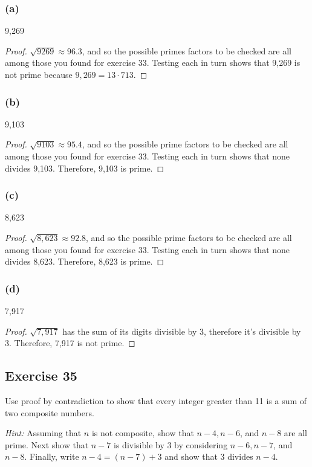 \documentclass[14pt]{extarticle}
\begin{document}
\subsubsection{(a)}
9,269

\begin{proof}
$\sqrt{9269} \approx 96.3$, and so the possible primes factors to be checked are all among those you found for exercise 33. Testing each in turn shows that 9,269 is not prime because $9,269 = 13 \cdot 713$.

\end{proof}

\subsubsection{(b)}
9,103

\begin{proof}
$\sqrt{9103} \approx 95.4$, and so the possible prime factors to be checked are all among those you found for exercise 33. Testing each in turn shows that none divides 9,103. Therefore, 9,103 is prime.
\end{proof}

\subsubsection{(c)}
8,623

\begin{proof}
$\sqrt{8,623} \approx 92.8$, and so the possible prime factors to be checked are all among those you found for exercise 33. Testing each in turn shows that none divides
8,623. Therefore, 8,623 is prime.
\end{proof}

\subsubsection{(d)}
7,917

\begin{proof}
$\sqrt{7,917}$ has the sum of its digits divisible by 3, therefore it's divisible by 3. Therefore, 7,917 is not prime.
\end{proof}

\subsection{Exercise 35}
Use proof by contradiction to show that every integer greater than 11 is a sum of two composite numbers.

{\it Hint:} Assuming that $n$ is not composite, show that
$n - 4, n - 6$, and $n - 8$ are all prime. Next show that
$n - 7$ is divisible by 3 by considering $n - 6, n - 7$,
and $n - 8$. Finally, write $n - 4 = (n - 7) + 3$ and show
that 3 divides $n - 4$.
\end{document}

